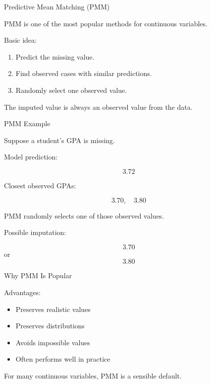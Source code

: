\documentclass{beamer}
\begin{document}
\begin{frame}{Predictive Mean Matching (PMM)}

PMM is one of the most popular methods for continuous variables.

\vspace{0.3cm}

Basic idea:

\begin{enumerate}
\item Predict the missing value.
\item Find observed cases with similar predictions.
\item Randomly select one observed value.
\end{enumerate}

\vspace{0.3cm}

The imputed value is always an observed value from the data.
\end{frame}

\begin{frame}{PMM Example}

Suppose a student's GPA is missing.

\vspace{0.3cm}

Model prediction:

\[
3.72
\]

\vspace{0.3cm}

Closest observed GPAs:

\[
3.70,\quad 3.80
\]

\vspace{0.3cm}

PMM randomly selects one of those observed values.

\vspace{0.3cm}

Possible imputation:

\[
3.70
\]
or
\[
3.80
\]
\end{frame}

\begin{frame}{Why PMM Is Popular}

Advantages:

\begin{itemize}
\item Preserves realistic values
\item Preserves distributions
\item Avoids impossible values
\item Often performs well in practice
\end{itemize}

\vspace{0.5cm}

For many continuous variables, PMM is a sensible default.
\end{frame}
\end{document}
